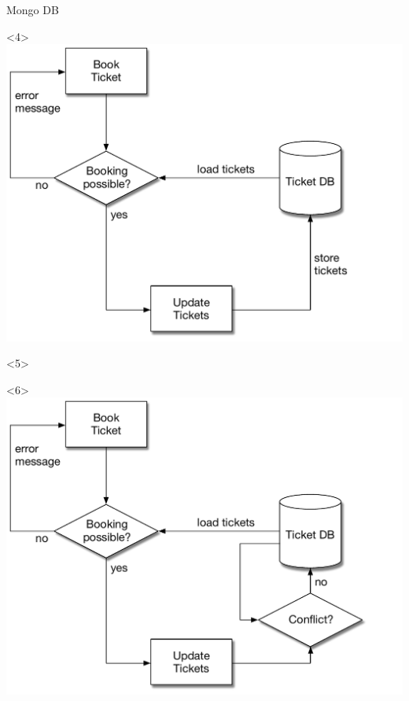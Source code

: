 \begin{frame}[fragile]{Mongo DB}
\begin{center}
\begin{onlyenv}<4>
\includegraphics[width=.85\textwidth]{../OptimisticLocking4.pdf}
\end{onlyenv}

\begin{onlyenv}<5>
%
\end{onlyenv}


\begin{onlyenv}<6>
\includegraphics[width=.85\textwidth]{../OptimisticLocking5.pdf}
\end{onlyenv}


\end{center}
\end{frame}
